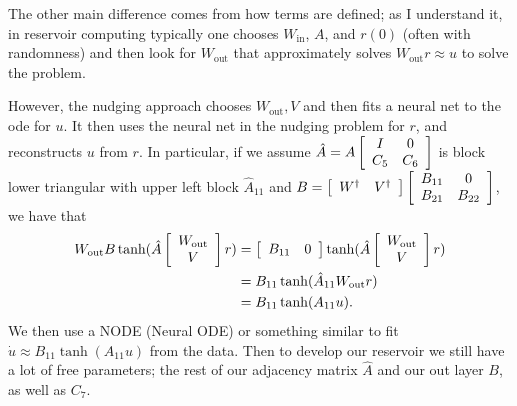 \documentclass{article}
\newcommand{\mat}[2]{
    \IfInteger{#1}{
        \left[\begin{array}{*{#1}c} #2 \end{array}\right]
    }{
        \left[\begin{array}{#1} #2 \end{array}\right]}
    }
\newcommand{\Wout}{W_{\text{out}}}
\newcommand{\Win}{W_{\text{in}}}
\begin{document}
The other main difference comes from how terms are defined; as I understand it, in reservoir computing typically one chooses $\Win$, $A$, and $r(0)$ (often with randomness) and then look for $\Wout$ that approximately solves $\Wout r \approx u$ to solve the problem. 

However, the nudging approach chooses $\Wout, V$ and then fits a neural net to the ode for $u$. It then uses the neural net in the nudging problem for $r$, and reconstructs $u$ from $r$. In particular, if we assume $\hat A = A\mat{2}{I & 0 \\ C_5 & C_6}$ is block lower triangular with upper left block $\hat A_{11}$ and $B = \mat{2}{W^\dagger & V^\dagger}\mat{2}{B_{11} & 0 \\ B_{21} & B_{22}}$, we have that 
\begin{align*}
    \Wout B\tanh(\hat A\mat{1}{\Wout\\V} r) &= \mat{2}{B_{11} & 0} \tanh (\hat A\mat{1}{\Wout \\ V}r)
    \\
    &= B_{11} \tanh (\hat A_{11}\Wout r)
    \\
    &=  B_{11} \tanh (A_{11} u).
\end{align*}
We then use a NODE (Neural ODE) or something similar to fit $\dot u \approx B_{11} \tanh (A_{11} u)$ from the data. Then to develop our reservoir we still have a lot of free parameters; the rest of our adjacency matrix $\hat A$ and our out layer $B$, as well as $C_7$. 
\end{document}
